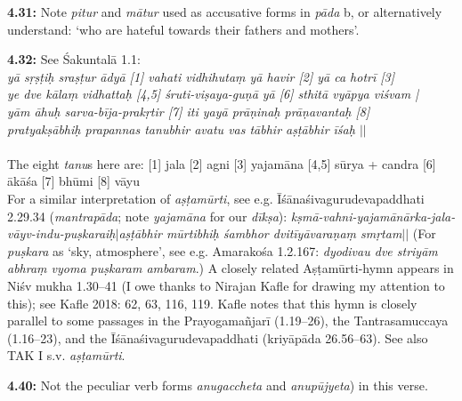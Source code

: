 \documentclass{article}
\newcommand{\vsnum}[1]{\textbf{#1}}
\newcommand{\skt}[1]{\textit{#1}}
\begin{document}
\vsnum{4.31: }Note \skt{pitur} and \skt{mātur} used as accusative forms in \skt{pāda} b, or alternatively understand: `who are hateful towards their fathers and mothers'.

\vsnum{4.32: }See Śakuntalā 1.1: \\ \skt{yā sṛṣṭiḥ sraṣṭur ādyā [1] vahati vidhihutaṃ yā havir [2] yā ca hotrī [3]\\ ye dve kālaṃ vidhattaḥ [4,5] śruti-viṣaya-guṇā yā [6] sthitā vyāpya viśvam |\\ yām āhuḥ sarva-bīja-prakṛtir [7] iti yayā prāṇinaḥ prāṇavantaḥ [8]\\ pratyakṣābhiḥ prapannas tanubhir avatu vas tābhir aṣṭābhir īśaḥ $||$}\\ \\ The eight \skt{tanu}s here are: [1] jala [2] agni [3] yajamāna [4,5] sūrya + candra [6] ākāśa [7] bhūmi [8] vāyu \\ For a similar interpretation of \skt{aṣṭamūrti}, see e.g. Īśānaśivagurudevapaddhati 2.29.34 (\skt{mantrapāda}; note \skt{yajamāna} for our \skt{dīkṣa}): \skt{kṣmā-vahni-yajamānārka-jala-vāyv-indu-puṣkaraiḥ}$|$\skt{aṣṭābhir mūrtibhiḥ śambhor dvitīyāvaraṇaṃ smṛtam}$||$ (For \skt{puṣkara} as `sky, atmosphere', see e.g. Amarakośa 1.2.167: \skt{dyodivau dve striyām abhraṃ vyoma puṣkaram ambaram}.) A closely related Aṣṭamūrti-hymn appears in Niśv mukha 1.30--41 (I owe thanks to Nirajan Kafle for drawing my attention to this); see Kafle 2018: 62, 63, 116, 119. Kafle notes that this hymn is closely parallel to some passages in the Prayogamañjarī (1.19--26), the Tantrasamuccaya (1.16--23), and the Īśānaśivagurudevapaddhati (kriyāpāda 26.56--63). See also TAK I s.v. \skt{aṣṭamūrti}.

\vsnum{4.40: }Not the peculiar verb forms \skt{anugaccheta} and \skt{anupūjyeta}) in this verse.
\end{document}
